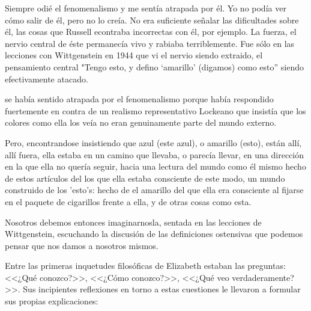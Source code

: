       Siempre odié el fenomenalismo y me sentía atrapada por él. Yo no podía ver cómo
      salir de él, pero no lo creía. No era suficiente señalar las dificultades sobre
      él, las cosas que Russell econtraba incorrectas con él, por ejemplo. La fuerza,
      el nervio central de éste permanecía vivo y rabiaba terriblemente. Fue sólo en
      las lecciones con Wittgenstein en 1944 que vi el nervio siendo extraido, el
      pensamiento central "Tengo esto, y defino `amarillo' (digamos) como esto''
      siendo efectivamente atacado.



      se había sentido atrapada por el fenomenalismo porque había respondido
      fuertemente en contra de un realismo representativo Lockeano que insistía que
      los colores como ella los veía no eran genuinamente parte del mundo externo.

      Pero, encontrandose insistiendo que azul (este azul), o amarillo (esto), están
      allí, allí fuera, ella estaba en un camino que llevaba, o parecía llevar, en una
      dirección en la que ella no quería seguir, hacia una lectura del mundo como él
      mismo hecho de estos artículos del los que ella estaba consciente de este modo,
      un mundo construido de los 'esto's: hecho de el amarillo del que ella era
      consciente al fijarse en el paquete de cigarillos frente a ella, y de otras
      cosas como esta.

      Nosotros debemos entonces imaginarnosla, sentada en las lecciones de
      Wittgenstein, escuchando la discusión de las definiciones ostensivas que podemos
      pensar que nos damos a nosotros mismos.



      Entre las primeras inquetudes filosóficas de Elizabeth estaban las preguntas:
      <<¿Qué conozco?>>, <<¿Cómo conozco?>>, <<¿Qué veo verdaderamente?>>. Sus
      incipientes reflexiones en torno a estas cuestiones le llevaron a formular sus
      propias explicaciones:



